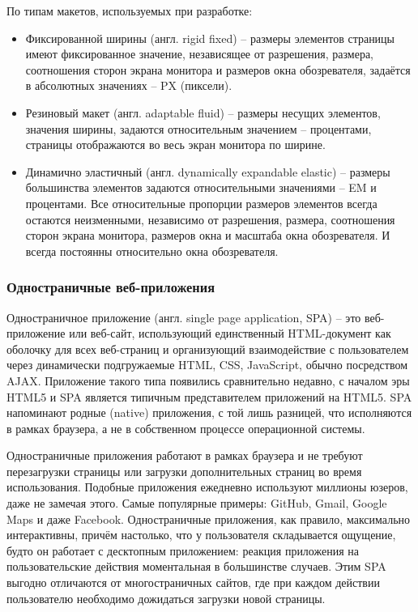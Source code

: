 По типам макетов, используемых при разработке:
\begin{itemize}
\item Фиксированной ширины (англ. rigid fixed) -- размеры элементов страницы имеют фиксированное значение, независящее от разрешения, размера, соотношения сторон экрана
монитора и размеров окна обозревателя, задаётся в абсолютных значениях -- PX (пиксели).
\item Резиновый макет (англ. adaptable fluid) -- размеры несущих элементов, значения ширины, задаются относительным значением -- процентами,
страницы отображаются во весь экран монитора по ширине.
\item Динамично эластичный (англ. dynamically expandable elastic) -- размеры большинства элементов задаются относительными значениями -- EM
и процентами. Все относительные пропорции размеров элементов всегда остаются неизменными, независимо от разрешения, размера, соотношения
сторон экрана монитора, размеров окна и масштаба окна обозревателя. И всегда постоянны относительно окна обозревателя.
\end{itemize}

\subsubsection{Одностраничные веб-приложения}
\label{sub:domain:overview_website:spa}
Одностраничное приложение (англ. single page application, SPA) -- это веб-приложение или веб-сайт, использующий единственный HTML-документ как оболочку для всех веб-страниц 
и организующий взаимодействие с пользователем через динамически подгружаемые HTML, CSS, JavaScript, обычно посредством AJAX. Приложение такого типа появились 
сравнительно недавно, с началом эры HTML5 и SPA является типичным представителем приложений на HTML5. SPA напоминают родные (native) приложения, с той лишь разницей, 
что исполняются в рамках браузера, а не в собственном процессе операционной системы.

Одностраничные приложения работают в рамках браузера и не требуют перезагрузки страницы или загрузки дополнительных страниц во время использования. Подобные 
приложения ежедневно используют миллионы юзеров, даже не замечая этого. Самые популярные примеры:  GitHub, Gmail, Google Maps и даже Facebook. Одностраничные приложения, 
как правило, максимально интерактивны, причём настолько, что у пользователя складывается ощущение, будто он работает с десктопным приложением: реакция приложения 
на пользовательские действия моментальная в большинстве случаев. Этим SPA выгодно отличаются от многостраничных сайтов, где при каждом действии пользователю необходимо 
дожидаться загрузки новой страницы.

